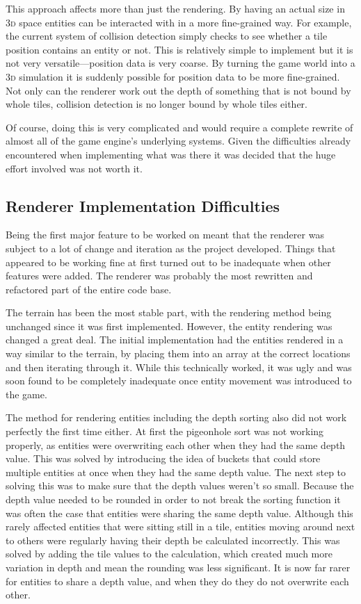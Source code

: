 This approach affects more than just the rendering. By having an actual size in \textsc{3d} space entities can be interacted with in a more fine-grained way. For example, the current system of collision detection simply checks to see whether a tile position contains an entity or not. This is relatively simple to implement but it is not very versatile---position data is very coarse. By turning the game world into a \textsc{3d} simulation it is suddenly possible for position data to be more fine-grained. Not only can the renderer work out the depth of something that is not bound by whole tiles, collision detection is no longer bound by whole tiles either.

Of course, doing this is very complicated and would require a complete rewrite of almost all of the game engine's underlying systems. Given the difficulties already encountered when implementing what was there it was decided that the huge effort involved was not worth it.

\subsection{Renderer Implementation Difficulties}
Being the first major feature to be worked on meant that the renderer was subject to a lot of change and iteration as the project developed. Things that appeared to be working fine at first turned out to be inadequate when other features were added. The renderer was probably the most rewritten and refactored part of the entire code base.

The terrain has been the most stable part, with the rendering method being unchanged since it was first implemented. However, the entity rendering was changed a great deal. The initial implementation had the entities rendered in a way similar to the terrain, by placing them into an array at the correct locations and then iterating through it. While this technically worked, it was ugly and was soon found to be completely inadequate once entity movement was introduced to the game.

The method for rendering entities including the depth sorting also did not work perfectly the first time either. At first the pigeonhole sort was not working properly, as entities were overwriting each other when they had the same depth value. This was solved by introducing the idea of buckets that could store multiple entities at once when they had the same depth value. The next step to solving this was to make sure that the depth values weren't so small. Because the depth value needed to be rounded in order to not break the sorting function it was often the case that entities were sharing the same depth value. Although this rarely affected entities that were sitting still in a tile, entities moving around next to others were regularly having their depth be calculated incorrectly. This was solved by adding the tile values to the calculation, which created much more variation in depth and mean the rounding was less significant. It is now far rarer for entities to share a depth value, and when they do they do not overwrite each other.

